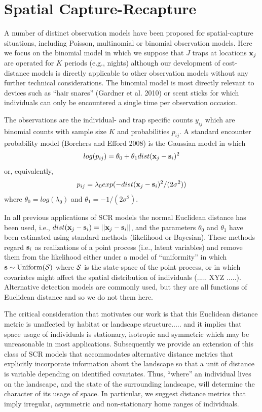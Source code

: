 \section{Spatial Capture-Recapture}

A number of distinct observation models have been proposed for
spatial-capture situations, including Poisson, multinomial or binomial
observation models. Here we focus on the binomial model in which we
suppose that $J$ traps at locations ${\bf x}_{j}$ are operated for $K$
periods (e.g., nights) although our development of cost-distance
models is directly applicable to other observation models without any
further technical considerations. The binomial model is most directly
relevant to devices such as ``hair snares'' (Gardner et al. 2010) or
scent sticks \citep{kery_etal:2010} for which individuals can only be
encountered a single time per observation occasion.

The observations are the individual- and trap specific counts $y_{ij}$
which are binomial counts with sample size $K$ and probabilities
$p_{ij}$. A standard encounter probability model (Borchers and Efford
2008) is the Gaussian model in which
\[
log(p_{ij})= \theta_{0} + \theta_{1} dist({\bf x}_{j} - {\bf s}_{i})^{2}
\]
or, equivalently, 
\[
p_{ij} = \lambda_{0} exp(-  dist({\bf x}_{j} - {\bf s}_{i})^{2}
/(2\sigma^{2}) )
\]
where $\theta_{0} = log(\lambda_{0})$ and $\theta_{1} =
-1/(2\sigma^2)$. 

In all previous applications of SCR models the normal Euclidean
distance has been used, i.e., $ dist({\bf x}_{j} - {\bf s}_{i}) =
||{\bf x}_{j} - {\bf s}_{i}||$,
and the parameters $\theta_0$ and $\theta_1$
have been estimated using standard methods (likelihood or
Bayesian). These methods regard ${\bf s}_{i}$ as realizations of a
point process (i.e., latent variables) and remove them from the
likelihood either under a model of ``uniformity'' in which ${\bf s}
\sim \mbox{Uniform}({\cal S})$ where ${\cal S}$ is the state-space of the
point process, or in which covariates might affect the spatial
distribution of individuals (..... XYZ .....). Alternative detection
models are commonly used, but they are all functions of Euclidean
distance and so we do not them here. 

The critical consideration that motivates our work is that this 
 Euclidean distance metric is unaffected by habitat or landscape
structure..... and it implies that space usage of individuals is
stationary, isotropic and symmetric which may be unreasonable in most
applications. 
Subsequently we provide an extension of this class of SCR models that
accommodates alternative distance metrics that explicitly incorporate
information about the landscape so that a unit of distance is variable
depending on identified covariates. Thus, ``where'' an individual
lives on the landscape, and the state of the surrounding landscape,
will determine the character of its usage of space. In particular, we
suggest distance metrics that imply irregular, asymmetric and
non-stationary home ranges of individuals. 

